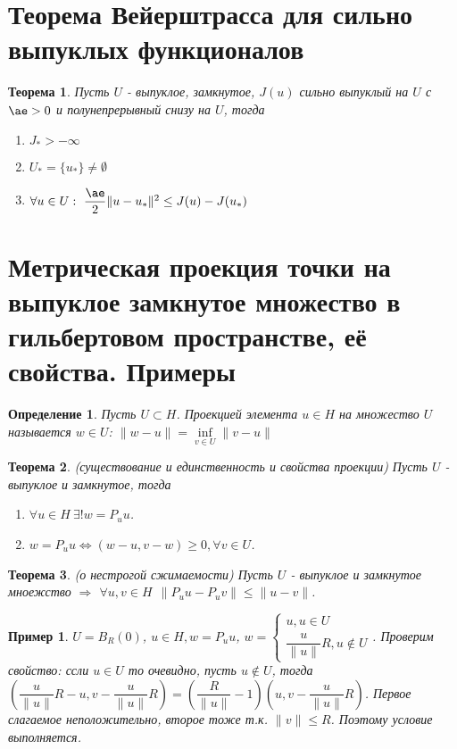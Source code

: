 \documentclass[9pt, a4paper]{extarticle}
\newtheorem*{theorem}{Теорема}
\newtheorem*{definition}{Определение}
\newtheorem*{sample}{Пример}
\begin{document}
\section{Теорема Вейерштрасса для сильно выпуклых функционалов}
	\begin{theorem}
		Пусть $U$ - выпуклое, замкнутое, $J(u)$ сильно выпуклый на $U$ с $\ae > 0$ и полунепрерывный снизу на $U$, тогда
		\begin{enumerate}
			\item $J_* > - \infty$
			\item $U_* = \{u_*\} \neq \emptyset$
			\item $\forall u \in U: \ \dfrac\ae2 \|u - u_*\|^2 \leq J(u) - J(u_*)$
		\end{enumerate}
	\end{theorem}
\section{Метрическая проекция точки на выпуклое замкнутое множество в гильбертовом пространстве, её свойства. Примеры}
	\begin{definition}
		Пусть $U \subset H$. Проекцией элемента $u \in H$ на множество $U$ называется $w \in U$: $\|w - u\| = \inf\limits_{v\in U} \|v - u\|$
	\end{definition}
	\begin{theorem}
		(существование и единственность и свойства проекции)\newline
		Пусть $U$ - выпуклое и замкнутое, тогда
		\begin{enumerate}
			\item $\forall u \in H \ \exists! w = P_uu$.
			\item $w = P_uu \Leftrightarrow (w-u, v- w) \geq 0, \forall v \in U$. 
		\end{enumerate}
	\end{theorem}
	\begin{theorem}
		(о нестрогой сжимаемости)\newline
		Пусть $U$ - выпуклое и замкнутое мноежство $\Rightarrow$  $\forall u, v \in H \ \ \|P_uu - P_uv\| \leq \|u - v\|$. 
	\end{theorem}
	\begin{sample}
		$U = B_R(0)$, $u \in H, w = P_uu$, $w = \begin{cases}
			u, u \in U \\
			\dfrac{u}{\|u\|}R, u \notin U
		\end{cases}		$. Проверим свойство: ссли $u \in U$ то очевидно, пусть $u \notin U$, тогда $(	\dfrac{u}{\|u\|}R - u, v - 	\dfrac{u}{\|u\|}R) = \left(\dfrac{R}{\|u\|} -1\right) (u, v - 	\dfrac{u}{\|u\|}R)$. Первое слагаемое неположительно, второе тоже т.к. $\|v\| \leq R$. Поэтому условие выполняется. 
	\end{sample}
\end{document}

